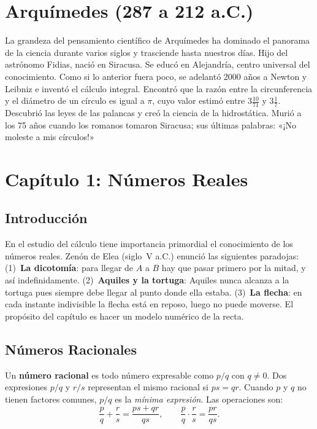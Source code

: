 \documentclass[12pt]{article}
\begin{document}
\section*{Arquímedes (287 a 212 a.C.)}

La grandeza del pensamiento científico de Arquímedes ha dominado el panorama de la ciencia durante varios siglos y trasciende hasta nuestros días. Hijo del astrónomo Fidias, nació en Siracusa. Se educó en Alejandría, centro universal del conocimiento. Como si lo anterior fuera poco, se adelantó 2000 años a Newton y Leibniz e inventó el cálculo integral. Encontró que la razón entre la circunferencia y el diámetro de un círculo es igual a $\pi$, cuyo valor estimó entre $3\tfrac{10}{71}$ y $3\tfrac{1}{7}$. Descubrió las leyes de las palancas y creó la ciencia de la hidrostática. Murió a los 75 años cuando los romanos tomaron Siracusa; sus últimas palabras: «¡No moleste a mis círculos!»

\section{Capítulo 1: Números Reales}

\subsection{Introducción}

En el estudio del cálculo tiene importancia primordial el conocimiento de los números reales. Zenón de Elea (siglo~V a.C.) enunció las siguientes paradojas: (1)~\textbf{La dicotomía}: para llegar de $A$ a $B$ hay que pasar primero por la mitad, y así indefinidamente. (2)~\textbf{Aquiles y la tortuga}: Aquiles nunca alcanza a la tortuga pues siempre debe llegar al punto donde ella estaba. (3)~\textbf{La flecha}: en cada instante indivisible la flecha está en reposo, luego no puede moverse. El propósito del capítulo es hacer un modelo numérico de la recta.

\subsection{Números Racionales}

Un \textbf{número racional} es todo número expresable como $p/q$ con $q \neq 0$. Dos expresiones $p/q$ y $r/s$ representan el mismo racional si $ps = qr$. Cuando $p$ y $q$ no tienen factores comunes, $p/q$ es la \textit{mínima expresión}. Las operaciones son:
\[ \frac{p}{q} + \frac{r}{s} = \frac{ps+qr}{qs}, \qquad \frac{p}{q} \cdot \frac{r}{s} = \frac{pr}{qs}. \]
\end{document}
